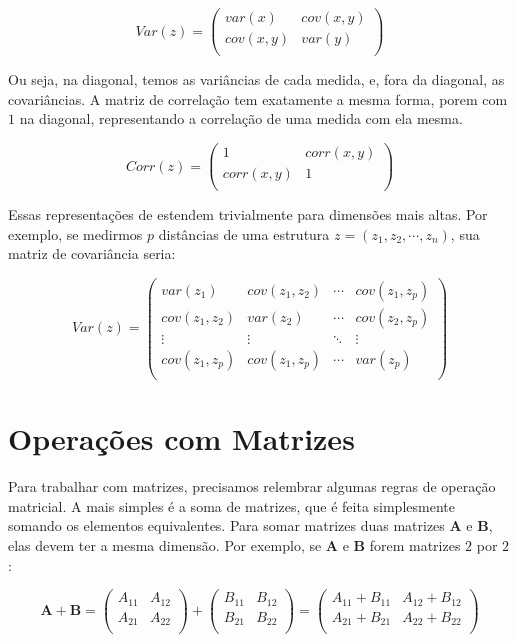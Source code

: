 \documentclass[portuges,]{tufte-handout}
\begin{document}
\[
Var(z) = \left (
\begin{smallmatrix}
var(x) & cov(x, y) \\
cov(x,y) & var(y)  \\
\end{smallmatrix}
\right )
\]

Ou seja, na diagonal, temos as variâncias de cada medida, e, fora da
diagonal, as covariâncias. A matriz de correlação tem exatamente a mesma
forma, porem com \(1\) na diagonal, representando a correlação de uma
medida com ela mesma.

\[
Corr(z) = \left (
\begin{smallmatrix}
1 & corr(x, y) \\
corr(x,y) & 1  \\
\end{smallmatrix}
\right )
\]

Essas representações de estendem trivialmente para dimensões mais altas.
Por exemplo, se medirmos \(p\) distâncias de uma estrutura
\(z = (z_1, z_2, \cdots, z_n)\), sua matriz de covariância seria:

\[
Var(z) = \left (
\begin{matrix}
var(z_1) & cov(z_1, z_2) & \cdots & cov(z_1, z_p) \\
cov(z_1, z_2) & var(z_2) & \cdots & cov(z_2, z_p) \\
\vdots & \vdots  & \ddots & \vdots                \\
cov(z_1, z_p) & cov(z_1, z_p) & \cdots & var(z_p) \\
\end{matrix}
\right )
\]

\section{Operações com Matrizes}\label{operauxe7uxf5es-com-matrizes}

Para trabalhar com matrizes, precisamos relembrar algumas regras de
operação matricial. A mais simples é a soma de matrizes, que é feita
simplesmente somando os elementos equivalentes. Para somar matrizes duas
matrizes \(\mathbf{A}\) e \(\mathbf{B}\), elas devem ter a mesma
dimensão. Por exemplo, se \(\mathbf{A}\) e \(\mathbf{B}\) forem matrizes
\(2\) por \(2\):

\[
\mathbf{A} + \mathbf{B} =
\left (
\begin{matrix}
A_{11} & A_{12}\\
A_{21} & A_{22}  \\
\end{matrix}
\right )
+
\left (
\begin{matrix}
B_{11} & B_{12}\\
B_{21} & B_{22}  \\
\end{matrix}
\right )
=
 \left (
\begin{matrix}
A_{11}+B_{11} & A_{12}+B_{12}\\
A_{21}+B_{21} & A_{22}+B_{22} \\
\end{matrix}
\right )
\]
\end{document}
